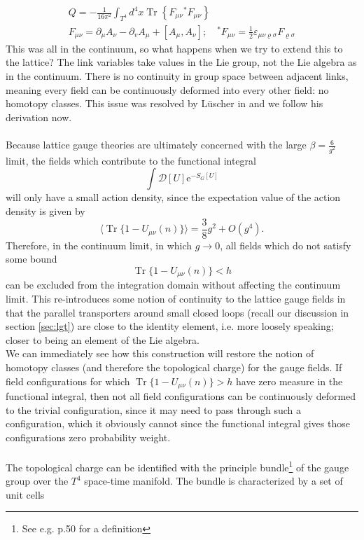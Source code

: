 \documentclass[a4paper,10pt]{article}
\begin{document}
\begin{equation}\label{eq:topChargeCont}
\begin{gathered}
Q=-\frac{1}{16 \pi^{2}} \int_{T^{4}} d^{4} x \operatorname{Tr}\left\{F_{\mu \nu}{ }^{*} F_{\mu \nu}\right\} \\
F_{\mu \nu}=\partial_{\mu} A_{\nu}-\partial_{v} A_{\mu}+\left[A_{\mu}, A_{\nu}\right] ; \quad ^* F_{\mu \nu}=\frac{1}{2} \varepsilon_{\mu \nu \varrho \sigma} F_{\varrho \sigma}
\end{gathered}
\end{equation}
This was all in the continuum, so what happens when we try to extend this to the lattice? The link variables take values in the Lie group, not the Lie algebra as in the continuum. There is no continuity in group space between adjacent links, meaning every field can be continuously deformed into every other field: no homotopy classes. This issue was resolved by Lüscher in \cite{L_scherM1982Tolg} and we follow his derivation now.\\\\Because lattice gauge theories are ultimately concerned with the large $\beta = \frac{6}{g^2}$ limit, the fields which contribute to the functional integral
\begin{equation*}
\int \mathcal{D}[U] \mathrm{e}^{-S_{G}[U]}
\end{equation*}
will only have a small action density, since the expectation value of the action density is given by
\begin{equation}\label{eq:actionDensityExpVal}
\langle\operatorname{Tr}\{1-U_{\mu \nu}(n)\}\rangle=\frac{3}{8} g^{2}+O\left(g^{4}\right).
\end{equation}
Therefore, in the continuum limit, in which $g\rightarrow 0$, all fields which do not satisfy some bound 
\begin{equation}\label{eq:SmoothnessBound_topCharge}
\operatorname{Tr}\{1-U_{\mu \nu}(n)\} < h
\end{equation}
can be excluded from the integration domain without affecting the continuum limit. This re-introduces some notion of continuity to the lattice gauge fields in that the parallel transporters around small closed loops (recall our discussion in section \ref{sec:lgt}) are close to the identity element, i.e. more loosely speaking; closer to being an element of the Lie algebra.\\We can immediately see how this construction will restore the notion of homotopy classes (and therefore the topological charge) for the gauge fields. If field configurations  for which $\operatorname{Tr}\{1-U_{\mu \nu}(n)\} > h$ have zero measure in the functional integral, then not all field configurations can be continuously deformed to the trivial configuration, since it may need to pass through such a configuration, which it obviously cannot since the functional integral gives those configurations zero probability weight.\\\\The topological charge can be identified with the principle bundle\footnote{See e.g. \cite{diffGeom} p.50 for a definition} of the gauge group over the $T^4$  space-time manifold. The bundle is characterized by a set of unit cells 
\end{document}
